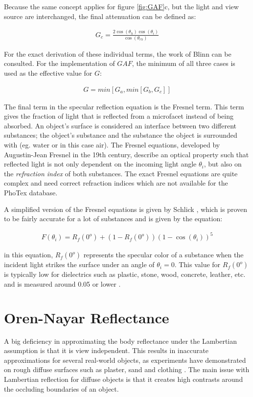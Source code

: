 \noindent Because the same concept applies for figure \ref{fig:GAF}c, but the light and view source are interchanged, the final attenuation can be defined as:

	\begin{eqnarray*}
		G_c = \frac{2\cos(\theta_h)\cos(\theta_i)}{\cos(\theta_{rh})}
	\end{eqnarray*}

\noindent For the exact derivation of these individual terms, the work of Blinn \cite{Blinn} can be consulted. For the implementation of $GAF$, the minimum of all three cases is used as the effective value for $G$:

	\begin{eqnarray*}
		G = min \left[ {G_a, min \left[ {G_b, G_c} \right] } \right]
	\end{eqnarray*}

\noindent The final term in the specular reflection equation is the Fresnel term. This term gives the fraction of light that is reflected from a microfacet instead of being absorbed. An object's surface is considered an interface between two different substances; the object's substance and the substance the object is surrounded with (eg. water or in this case air). The Fresnel equations, developed by Augustin-Jean Fresnel in the 19th century, describe an optical property such that reflected light is not only dependent on the incoming light angle $\theta_i$, but also on the \textit{refraction index} of both substances. The exact Fresnel equations are quite complex and need correct refraction indices which are not available for the PhoTex database. 

A simplified version of the Fresnel equations is given by Schlick \cite{Schlick}, which is proven to be fairly accurate for a lot of substances and is given by the equation:

	\begin{eqnarray*}
		F(\theta_i) = R_f(0^o) + (1 - R_f(0^o))(1 - \cos(\theta_i))^5
	\end{eqnarray*}

\noindent in this equation, $R_f(0^o)$ represents the specular color of a substance when the incident light strikes the surface under an angle of $\theta_i = 0$. This value for $R_f(0^o)$ is typically low for dielectrics such as plastic, stone, wood, concrete, leather, etc. and is measured around 0.05 or lower \cite{RTR}. 


\section{Oren-Nayar Reflectance}\label{sec:OrenNayar}
A big deficiency in approximating the body reflectance under the Lambertian assumption is that it is view independent. This results in inaccurate approximations for several real-world objects, as experiments have demonstrated on rough diffuse surfaces such as plaster, sand and clothing \cite{OrenNayar}. The main issue with Lambertian reflection for diffuse objects is that it creates high contrasts around the occluding boundaries of an object.


